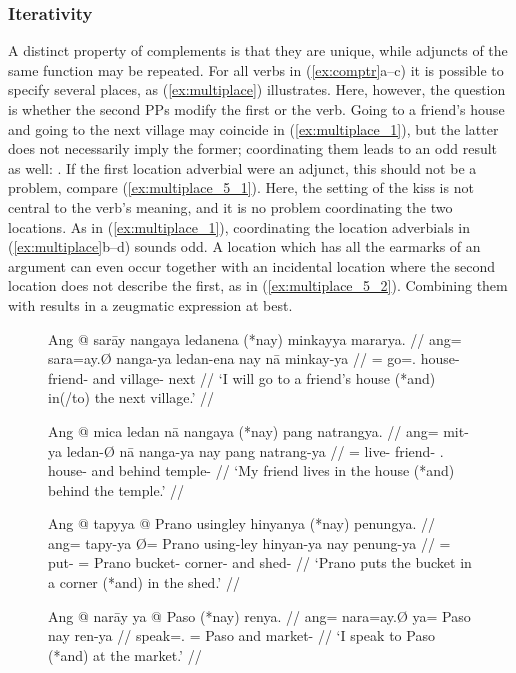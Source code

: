\subsubsection{Iterativity}

A distinct property of complements is that they are unique, while adjuncts of
the same function may be repeated. For all verbs in (\ref{ex:comptr}a--c) it is
possible to specify several places, as (\ref{ex:multiplace}) illustrates. Here,
however, the question is whether the second PPs modify the first or the verb.
Going to a friend's house and going to the next village may coincide in
(\ref{ex:multiplace_1}), but the latter does not necessarily imply the former;
coordinating them leads to an odd result as well: . If the first location adverbial were an adjunct, this
should not be a problem, compare (\ref{ex:multiplace_5_1}). Here, the setting
of the kiss is not central to the verb's meaning, and it is no problem
coordinating the two locations. As in (\ref{ex:multiplace_1}), coordinating the
location adverbials in (\ref{ex:multiplace}b–d) sounds odd. A location which
has all the earmarks of an argument can even occur together with an incidental
location where the second location does not describe the first, as in
(\ref{ex:multiplace_5_2}). Combining them with  results in a
zeugmatic expression at best.

\begin{figure}
\pex\label{ex:multiplace}
\a\label{ex:multiplace_1}\begingl
	\gla Ang @ sarāy nangaya ledanena \textup{(}*nay\textup{)} minkayya
		mararya. //
	\glb ang= sara=ay.Ø nanga-ya ledan-ena nay nā minkay-ya //
	\glc \AgtT{}= go=\Fsg{}.\Top{} house-\Loc{} friend-\Gen{} and
		village-\Loc{} next //
	\glft `I will go to a friend's house (*and) in(/to) the next village.' //
\endgl

\a\label{ex:multiplace_2}\begingl
	\gla Ang @ mica ledan nā nangaya \textup{(}*nay\textup{)} pang 
		natrangya. //
	\glb ang= mit-ya ledan-Ø nā nanga-ya nay pang natrang-ya //
	\glc \AgtT{}= live-\TsgM{} friend-\Top{} \Fsg{}.\Gen{} house-\Loc{} and
		behind temple-\Loc{} //
	\glft `My friend lives in the house (*and) behind the temple.' //
\endgl

\a\label{ex:multiplace_3}\begingl
	\gla Ang @ tapyya {} @ Prano usingley hinyanya \textup{(}*nay\textup{)}
		penungya. //
	\glb ang= tapy-ya Ø= Prano using-ley hinyan-ya nay penung-ya //
	\glc \AgtT{}= put-\TsgM{} \Top{}= Prano bucket-\PargI{} corner-\Loc{}
		and shed-\Loc {} //
	\glft `Prano puts the bucket in a corner (*and) in the shed.' //
\endgl

\a\label{ex:multiplace_4}\begingl
	\gla Ang @ narāy ya @ Paso \textup{(}*nay\textup{)} renya. //
	\glb ang= nara=ay.Ø ya= Paso nay ren-ya //
	\glc \AgtT{} speak=\Fsg{}.\Top{} \Loc{}= Paso and market-\Loc{} //
	\glft `I speak to Paso (*and) at the market.' //
\endgl
\xe
\end{figure}

